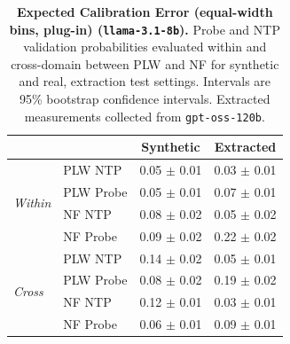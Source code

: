 \begin{table}[ht]
\centering
\begin{tabular}{ll cc}
\toprule
& & Synthetic & Extracted \\
\midrule
\multirow{4}{*}{\textit{Within}}
& PLW NTP & 0.05 $\pm$ 0.01 & 0.03 $\pm$ 0.01 \\
& PLW Probe & 0.05 $\pm$ 0.01 & 0.07 $\pm$ 0.01 \\
& NF NTP & 0.08 $\pm$ 0.02 & 0.05 $\pm$ 0.02 \\
& NF Probe & 0.09 $\pm$ 0.02 & 0.22 $\pm$ 0.02 \\
\midrule
\multirow{4}{*}{\textit{Cross}}
& PLW NTP & 0.14 $\pm$ 0.02 & 0.05 $\pm$ 0.01 \\
& PLW Probe & 0.08 $\pm$ 0.02 & 0.19 $\pm$ 0.02 \\
& NF NTP & 0.12 $\pm$ 0.01 & 0.03 $\pm$ 0.01 \\
& NF Probe & 0.06 $\pm$ 0.01 & 0.09 $\pm$ 0.01 \\
\bottomrule
\end{tabular}
\caption{\textbf{Expected Calibration Error (equal-width bins, plug-in) (\texttt{llama-3.1-8b}).} Probe and NTP validation probabilities evaluated within and cross-domain between PLW and NF for synthetic and real, extraction test settings. Intervals are 95\% bootstrap confidence intervals. Extracted measurements collected from \texttt{gpt-oss-120b}.}
\label{tab:llama-3.1-8b-gpt-oss-120b-pond_nfix-ece}
\end{table}
